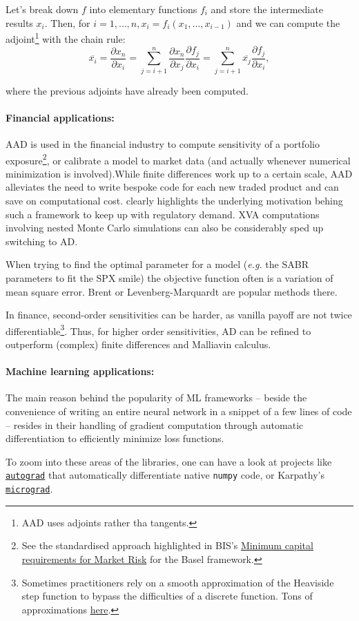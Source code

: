 Let's break down $f$ into elementary functions $f_i$ and store the intermediate results $x_i$. Then, for $i = 1,\dots,n, x_i = f_i(x_1, \dots, x_{i-1})$ and we can compute the adjoint\footnote{AAD uses adjoints rather tha tangents.} with the chain rule: \[\overline{x_i} = \dfrac{\partial x_n}{\partial x_i} = \sum_{j=i+1}^n \dfrac{\partial x_n}{\partial x_j} \dfrac{\partial f_j}{\partial x_i} = \sum_{j=i+1}^n \overline{x_j} \dfrac{\partial f_j}{\partial x_i},\]

where the previous adjoints have already been computed.

\paragraph*{Financial applications:}

AAD is used in the financial industry to compute sensitivity of a portfolio exposure\footnote{See the standardised approach highlighted in BIS's \href{https://www.bis.org/bcbs/publ/d457.pdf}{Minimum capital requirements for Market Risk} for the Basel framework.}, or calibrate a model to market data (and actually whenever numerical minimization is involved).\newline While finite differences work up to a certain scale, AAD alleviates the need to write bespoke code for each new traded product and can save on computational cost. \cite{geeraert2017mini} clearly highlights the underlying motivation behing such a framework to keep up with regulatory demand. XVA computations involving nested Monte Carlo simulations can also be considerably sped up switching to AD.

When trying to find the optimal parameter for a model (\textit{e.g.} the SABR parameters to fit the SPX smile) the objective function often is a variation of mean square error. Brent or Levenberg-Marquardt are popular methods there.

In finance, second-order sensitivities can be harder, as vanilla payoff are not twice differentiable\footnote{Sometimes practitioners rely on a smooth approximation of the Heaviside step function to bypass the difficulties of a discrete function. Tons of approximations \href{https://github.com/norse/norse/blob/main/norse/torch/functional/threshold.py}{here}.}. Thus, for higher order sensitivities, AD can be refined to outperform (complex) finite differences and Malliavin calculus.

\paragraph*{Machine learning applications:}

The main reason behind the popularity of ML frameworks -- beside the convenience of writing an entire neural network in a snippet of a few lines of code -- resides in their handling of gradient computation through automatic differentiation to efficiently minimize loss functions.

To zoom into these areas of the libraries, one can have a look at projects like \href{https://github.com/HIPS/autograd}{\texttt{autograd}} that automatically differentiate native \texttt{numpy} code, or Karpathy's \href{https://github.com/karpathy/micrograd}{\texttt{micrograd}}.

